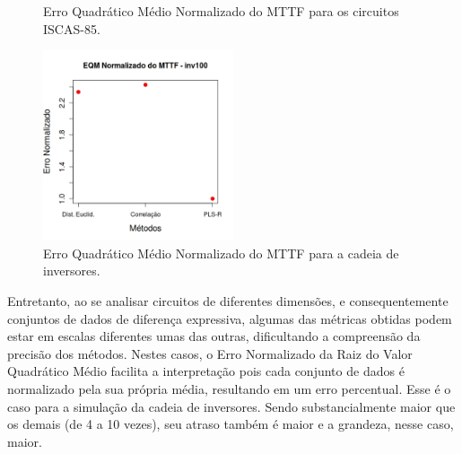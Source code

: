 \begin{figure}[H]
{	}
	\hfill
	\caption{Erro Quadrático Médio Normalizado do MTTF para os circuitos ISCAS-85.}
	\label{figure:NMSE_MTTF}
\end{figure}
\begin{figure}[H]
	\center
	\includegraphics[width=0.5\textwidth]{images/NMSE_MTTF_inv100_random}
	\caption{Erro Quadrático Médio Normalizado do MTTF para a cadeia de inversores.}
	\label{figure:NMSE_MTTF_inv100_random}	
\end{figure}

Entretanto, ao se analisar circuitos de diferentes dimensões, e consequentemente conjuntos de dados de diferença expressiva, algumas das métricas obtidas podem estar em escalas diferentes umas das outras, dificultando a compreensão da precisão dos métodos. Nestes casos, o Erro Normalizado da Raiz do Valor Quadrático Médio facilita a interpretação pois cada conjunto de dados é normalizado pela sua própria média, resultando em um erro percentual. Esse é o caso para a simulação da cadeia de inversores. Sendo substancialmente maior que os demais (de 4 a 10 vezes), seu atraso também é maior e a grandeza, nesse caso, maior. 

